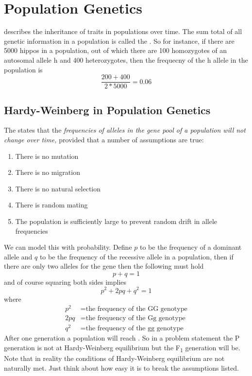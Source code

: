 \documentclass[../Bio_chemistryReview.tex]{subfiles}
\begin{document}
\section{Population Genetics}
 describes the inheritance of traits in populations
over time. The sum total of all genetic information in a population is called
the . So for instance, if there are 5000 hippos in a
population, out of which there are 100 homozygotes of an autosomal allele h and
400 heterozygotes, then the frequecny of the h allele in the population is 
\[ \frac{200 + 400}{2*5000} = 0.06 \]

\subsection{Hardy-Weinberg in Population Genetics}
\begin{infobox}
The  states that the \textit{frequencies of alleles
in the gene pool of a population will not change over time,} provided that a
number of assumptions are true:
\begin{enumerate}
  \item There is no mutation
  \item There is no migration
  \item There is no natural selection
  \item There is random mating
  \item The population is sufficiently large to prevent random drift in allele
    frequencies
\end{enumerate}
\end{infobox}
We can model this with probability. Define $ p $ to be the frequency of a
dominant allele and $ q $ to be the frequency of the recessive allele in a
population, then if there are only two alleles for the gene then the following
must hold
\begin{equation}
  p + q = 1
\end{equation}
and of course squaring both sides implies
\begin{equation} 
  p^{2}  + 2pq + q^{2} = 1
\end{equation}
where
\begin{align*}
  p^{2} &= \mbox{the frequency of the GG genotype} \\
  2pq &= \mbox{the frequency of the Gg genotype} \\
  q^{2} &= \mbox{the frequency of the gg genotype}
\end{align*}
After one generation a population will reach . So in a problem statement the P generation is not at
Hardy-Weinberg equilibrium but the F\textsubscript{1} generation will be. Note
that in reality the conditions of Hardy-Weinberg equilibrium are not naturally
met. Just think about how easy it is to break the assumptions listed.
\end{document}

